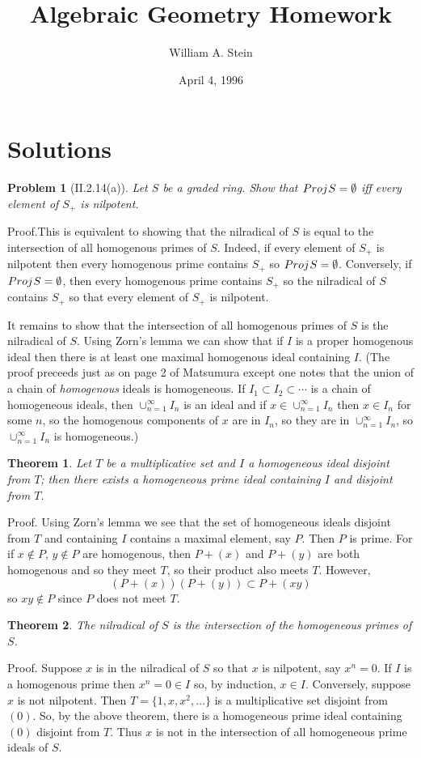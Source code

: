 \documentclass[12pt]{article}
\author{William A. Stein}
\title{Algebraic Geometry Homework}
\date{April 4, 1996}
\newtheorem{prob}{Problem}
\newtheorem{theorem}{Theorem}
\newcommand{\proj}{Proj \hspace{.01in}}
\newcommand{\proof}{\mbox{\sc Proof.\hspace{.1in}}}
\begin{document}
\maketitle

\section{Solutions}

\begin{prob}[II.2.14(a)] 
Let $S$ be a graded ring. Show that $\proj S=\emptyset$ 
iff every element of $S_{+}$ is nilpotent.
\end{prob}
\proof This is equivalent to showing that the nilradical of $S$ is equal
to the intersection of all homogenous primes of $S$. Indeed, if every
element of $S_{+}$ is nilpotent then every homogenous prime contains 
$S_{+}$ so $\proj S=\emptyset$. Conversely, if $\proj S=\emptyset$, then
every homogenous prime contains $S_{+}$ so the nilradical of $S$ contains
$S_{+}$ so that every element of $S_{+}$ is nilpotent. 

It remains to show that the intersection of all homogenous primes of $S$
is the nilradical of $S$. Using Zorn's lemma we can show that if $I$ is
a proper homogenous ideal then there is at least one maximal homogenous
ideal containing $I$. (The proof preceeds just as on page 2 of Matsumura
except one notes that the union of a chain of {\em homogenous} ideals
is homogeneous. If $I_1 \subset I_2 \subset \cdots$ is a chain of
homogeneous ideals, then $\cup_{n=1}^{\infty} I_n$ is an ideal and
if $x\in\cup_{n=1}^{\infty} I_n$ then $x\in I_n$ for some $n$, so the 
homogenous components of $x$ are in $I_n$, so they are in 
$\cup_{n=1}^{\infty} I_n$, so $\cup_{n=1}^{\infty} I_n$ is
homogeneous.)
  
\begin{theorem}
Let $T$ be a multiplicative set and $I$ a homogeneous ideal disjoint
from $T$; then there exists a homogeneous prime ideal containing 
$I$ and disjoint from $T$.
\end{theorem}
\proof
Using Zorn's lemma we see that the set of homogeneous ideals disjoint
from $T$ and containing $I$ contains a maximal element, say $P$. Then
$P$ is prime. For if $x\notin P$, $y\notin P$ are homogenous, then
$P+(x)$ and $P+(y)$ are both homogenous and so they meet $T$, so their
product also meets $T$. However,
$$(P+(x))(P+(y))\subset P+(xy)$$
so $xy\notin P$ since $P$ does not meet $T$. 

\begin{theorem}
The nilradical of $S$ is the intersection of the homogeneous primes
of $S$.
\end{theorem}
\proof
Suppose $x$ is in the nilradical of $S$ so that $x$ is nilpotent, say
$x^n=0$. If $I$ is a homogenous prime then $x^n=0\in I$ so, by induction,
$x\in I$. Conversely, suppose $x$ is not nilpotent. Then 
$T=\{1,x,x^2,\ldots\}$ is a multiplicative set disjoint from $(0)$. So,
by the above theorem, there is a homogeneous prime ideal containing
$(0)$ disjoint from $T$. Thus $x$ is not in the intersection of all 
homogeneous prime ideals of $S$. 
\end{document}
